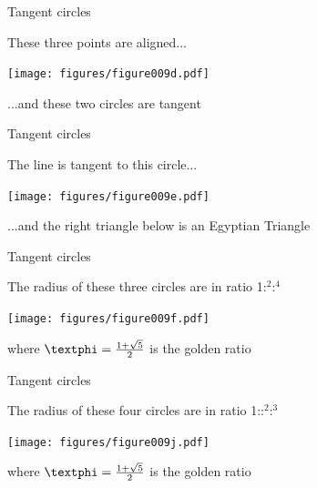 \documentclass[14pt]{beamer}
\begin{document}
    \begin{frame}{Tangent circles}
        \begin{center}
            These three points are aligned...
        \end{center}
        \hspace{3.92em} \texttt{[image: figures/figure009d.pdf]} \\
        \begin{center}
             ...and these two circles are tangent
        \end{center}
    \end{frame}


    \begin{frame}{Tangent circles}
        \begin{center}
            The line is tangent to this circle...
        \end{center}
        \hspace{6.18em} \texttt{[image: figures/figure009e.pdf]} \\
        \begin{center}
             ...and the right triangle below is an Egyptian Triangle
        \end{center}
    \end{frame}


    \begin{frame}{Tangent circles}
        \begin{center}
            The radius of these three circles are in ratio 1:\textphi$^2$:\textphi$^4$
        \end{center}\medskip
        \hspace{6.18em} \texttt{[image: figures/figure009f.pdf]} \\
        \begin{center}
             where $\text{\textphi} =\tfrac{1+\sqrt{5}}{2}$ is the golden ratio
        \end{center}
    \end{frame}


    \begin{frame}{Tangent circles}
        \begin{center}
            The radius of these four circles are in ratio 1:\textphi:\textphi$^2$:\textphi$^3$
        \end{center}\medskip
        \hspace{6.18em} \texttt{[image: figures/figure009j.pdf]} \\
        \begin{center}
             where $\text{\textphi} =\tfrac{1+\sqrt{5}}{2}$ is the golden ratio
        \end{center}
    \end{frame}
\end{document}

